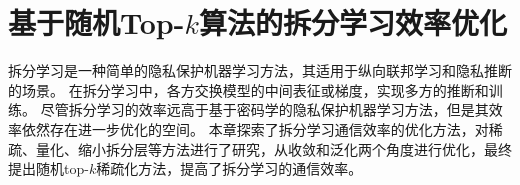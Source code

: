 \chapter{基于随机Top-$k$算法的拆分学习效率优化}
\label{chap:randomized_topk}

拆分学习是一种简单的隐私保护机器学习方法，其适用于纵向联邦学习和隐私推断的场景。
%
在拆分学习中，各方交换模型的中间表征或梯度，实现多方的推断和训练。
%
尽管拆分学习的效率远高于基于密码学的隐私保护机器学习方法，但是其效率依然存在进一步优化的空间。
%
本章探索了拆分学习通信效率的优化方法，对稀疏、量化、缩小拆分层等方法进行了研究，从收敛和泛化两个角度进行优化，最终提出随机top-$k$稀疏化方法，提高了拆分学习的通信效率。
%





